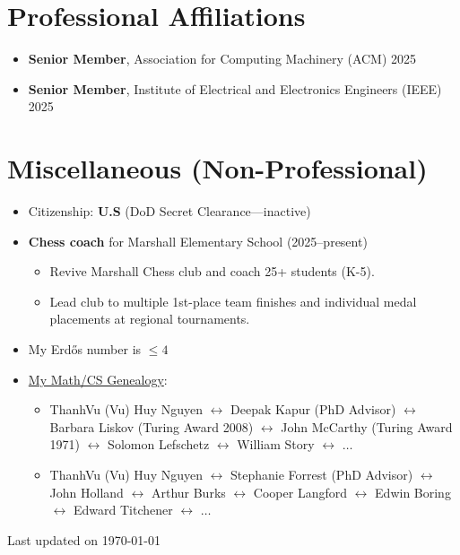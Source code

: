 \documentclass[11pt]{article}
\newcommand{\updateinfo}[1][\today]{\par\vfill\hfill{\faPencil{} \scriptsize \color{darkgray}Last updated on #1}}
\newcommand{\myname}{ThanhVu (Vu) Huy Nguyen}
\begin{document}
\section{Professional Affiliations}
\begin{itemize}
    \item \textbf{Senior Member},  Association for Computing Machinery (ACM) \hfill  2025
    \item \textbf{Senior Member}, Institute of Electrical and Electronics Engineers (IEEE) \hfill 2025
\end{itemize}

\section{Miscellaneous (Non-Professional)}
\begin{itemize}
    \item Citizenship: \textbf{U.S} (DoD Secret Clearance---inactive)
  \item \textbf{Chess coach} for Marshall Elementary School (2025--present)
        \begin{itemize}
            \item Revive Marshall Chess club and coach 25+ students (K-5).
            \item Lead club to multiple 1st-place team finishes and individual medal placements at regional tournaments.
        \end{itemize}
    \item My Erd\H{o}s number is $\le 4$
    \item \href{https://www.mathgenealogy.org/id.php?id=190564}{My Math/CS Genealogy}:
    \begin{itemize}[before=\small]
        \item \myname{}  $\leftrightarrow$  Deepak Kapur (PhD Advisor)   $\leftrightarrow$ Barbara  Liskov (Turing Award 2008) $\leftrightarrow$ John McCarthy (Turing Award 1971)  $\leftrightarrow$ Solomon Lefschetz $\leftrightarrow$   William Story  $\leftrightarrow$ $\dots$
        \item \myname{} $\leftrightarrow$ Stephanie Forrest (PhD Advisor)    $\leftrightarrow$ John Holland $\leftrightarrow$  Arthur Burks $\leftrightarrow$ Cooper Langford  $\leftrightarrow$ Edwin Boring $\leftrightarrow$ Edward Titchener  $\leftrightarrow$ $\dots$
    \end{itemize}
\end{itemize}
\updateinfo{}
\end{document}
